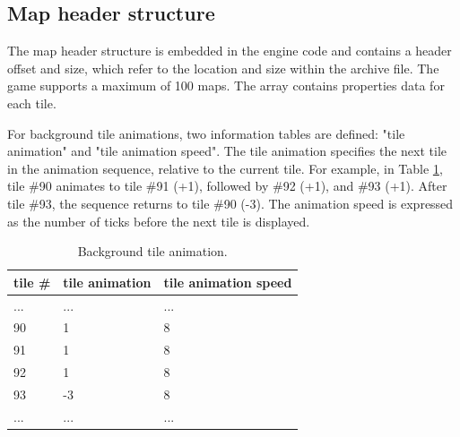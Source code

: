 \documentclass[book.tex]{subfiles}
\begin{document}
 
\subsection{Map header structure}
The map header structure is embedded in the engine code and contains a header offset and size, which refer to the location and size within the  archive file. The game supports a maximum of 100 maps. The  array contains properties data for each tile.\\

\par
\begin{minipage}{\textwidth}
 \par
 \end{minipage}


\par 
For background tile animations, two information tables are defined: "tile animation" and "tile animation speed". The tile animation specifies the next tile in the animation sequence, relative to the current tile. For example, in Table \ref{table:background tile anim}, tile \#90 animates to tile \#91 (+1), followed by \#92 (+1), and \#93 (+1). After tile \#93, the sequence returns to tile \#90 (-3). The animation speed is expressed as the number of ticks before the next tile is displayed. \\
 \begin{table}[H]
  \begin{tabularx}{\textwidth}[c]{XXX}
  \hline
  \textbf{tile \#} & \textbf{tile animation} & \textbf{tile animation speed}   \\ \hline
  ...             & ...          & ...    \\
  90             & 1          & 8    \\
  91            & 1          & 8    \\
  92             & 1          & 8    \\
  93             & -3          & 8    \\
  ...             & ...          & ...    \\
  \end{tabularx}
  \caption{Background tile animation.}
  \label{table:background tile anim}
  \end{table}
  
\end{document}
